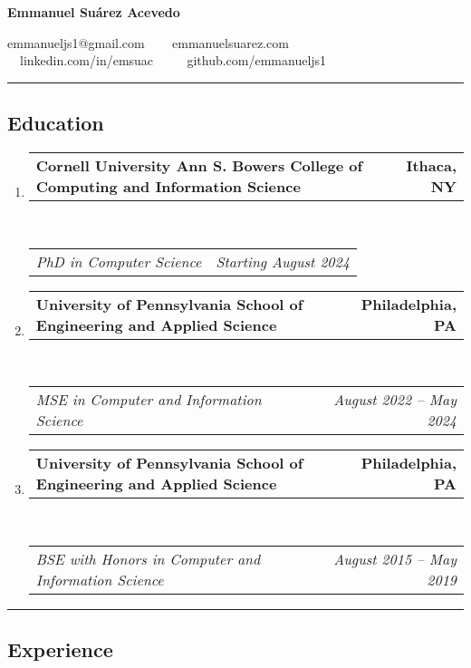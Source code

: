 \documentclass[letterpaper]{article}
\makeatletter
\newif\iflong
\newcommand{\headerrow}[2]
{\begin{tabular*}{\linewidth}{l@{\extracolsep{\fill}}r}
	#1 &
	#2 \\
\end{tabular*}}
\makeatother
\begin{document}
\begin{center}
{\LARGE \textbf{Emmanuel Suárez Acevedo}}

emmanueljs1@gmail.com \ \textbullet
\ \ emmanuelsuarez.com \\

\ \ linkedin.com/in/emsuac \ \ \textbullet
\ \ github.com/emmanueljs1\\
\end{center}
\hrule

\iflong
\subsection*{Research Interests}
\begin{enumerate}[label=]
       \parskip=-0.25em

    \item Programming language theory, type theory, proof assistants
\end{enumerate}
\hrule
\fi

\subsection*{Education}
  
\begin{enumerate}[label=]
	\parskip=-0.05em
	\item
	\headerrow
        {\textbf{Cornell University Ann S. Bowers College of Computing and Information Science}}
		{\textbf{Ithaca, NY}}
	\\
	\headerrow
		{\emph{PhD in Computer Science}}
        {\emph{Starting August 2024}}

	\item 
	\headerrow
		{\textbf{University of Pennsylvania School of Engineering and Applied Science}}
		{\textbf{Philadelphia, PA}}
	\\
	\headerrow
		{\emph{MSE in Computer and Information Science}}
		{\emph{August 2022 -- May 2024}}

	\item 
	\headerrow
		{\textbf{University of Pennsylvania School of Engineering and Applied Science}}
		{\textbf{Philadelphia, PA}}
	\\
	\headerrow
		{\emph{BSE with Honors in Computer and Information Science}}
		{\emph{August 2015 -- May 2019}}

\end{enumerate}

\hrule
\subsection*{Experience}
\end{document}
